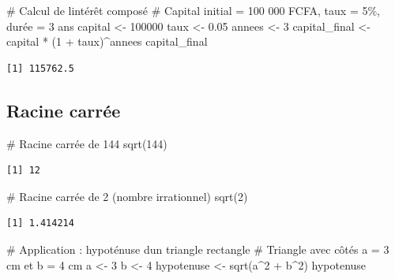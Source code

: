 \documentclass[
  french,
  11pt,
  a4paper,
]{article}
\newenvironment{Shaded}{}{}
\newcommand{\CommentTok}[1]{\textcolor[rgb]{0.42,0.45,0.49}{#1}}
\newcommand{\DecValTok}[1]{\textcolor[rgb]{0.00,0.36,0.77}{#1}}
\newcommand{\FloatTok}[1]{\textcolor[rgb]{0.00,0.36,0.77}{#1}}
\newcommand{\FunctionTok}[1]{\textcolor[rgb]{0.44,0.26,0.76}{#1}}
\newcommand{\NormalTok}[1]{\textcolor[rgb]{0.14,0.16,0.18}{#1}}
\newcommand{\OtherTok}[1]{\textcolor[rgb]{0.44,0.26,0.76}{#1}}
\newcommand{\SpecialCharTok}[1]{\textcolor[rgb]{0.00,0.36,0.77}{#1}}
\begin{document}
\begin{Shaded}
\begin{Highlighting}[]
\CommentTok{\# Calcul de l\textquotesingle{}intérêt composé}
\CommentTok{\# Capital initial = 100 000 FCFA, taux = 5\%, durée = 3 ans}
\NormalTok{capital }\OtherTok{\textless{}{-}} \DecValTok{100000}
\NormalTok{taux }\OtherTok{\textless{}{-}} \FloatTok{0.05}
\NormalTok{annees }\OtherTok{\textless{}{-}} \DecValTok{3}
\NormalTok{capital\_final }\OtherTok{\textless{}{-}}\NormalTok{ capital }\SpecialCharTok{*}\NormalTok{ (}\DecValTok{1} \SpecialCharTok{+}\NormalTok{ taux)}\SpecialCharTok{\^{}}\NormalTok{annees}
\NormalTok{capital\_final}
\end{Highlighting}
\end{Shaded}

\begin{verbatim}
[1] 115762.5
\end{verbatim}

\subsection{Racine carrée}\label{racine-carruxe9e}

\begin{Shaded}
\begin{Highlighting}[]
\CommentTok{\# Racine carrée de 144}
\FunctionTok{sqrt}\NormalTok{(}\DecValTok{144}\NormalTok{)}
\end{Highlighting}
\end{Shaded}

\begin{verbatim}
[1] 12
\end{verbatim}

\begin{Shaded}
\begin{Highlighting}[]
\CommentTok{\# Racine carrée de 2 (nombre irrationnel)}
\FunctionTok{sqrt}\NormalTok{(}\DecValTok{2}\NormalTok{)}
\end{Highlighting}
\end{Shaded}

\begin{verbatim}
[1] 1.414214
\end{verbatim}

\begin{Shaded}
\begin{Highlighting}[]
\CommentTok{\# Application : hypoténuse d\textquotesingle{}un triangle rectangle}
\CommentTok{\# Triangle avec côtés a = 3 cm et b = 4 cm}
\NormalTok{a }\OtherTok{\textless{}{-}} \DecValTok{3}
\NormalTok{b }\OtherTok{\textless{}{-}} \DecValTok{4}
\NormalTok{hypotenuse }\OtherTok{\textless{}{-}} \FunctionTok{sqrt}\NormalTok{(a}\SpecialCharTok{\^{}}\DecValTok{2} \SpecialCharTok{+}\NormalTok{ b}\SpecialCharTok{\^{}}\DecValTok{2}\NormalTok{)}
\NormalTok{hypotenuse}
\end{Highlighting}
\end{Shaded}
\end{document}
